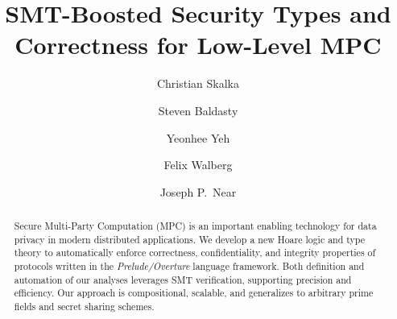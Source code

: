 \title{SMT-Boosted Security Types and Correctness for Low-Level MPC}

\author{Christian Skalka}

\author{Steven Baldasty}

\author{Yeonhee Yeh}

\author{Felix Walberg}

\author{Joseph P.~Near}

\begin{abstract}
  Secure Multi-Party Computation (MPC) is an important enabling
  technology for data privacy in modern distributed applications. We
  develop a new Hoare logic and type theory to automatically enforce
  correctness, confidentiality, and integrity properties of protocols
  written in the \emph{Prelude/Overture} language framework. Both
  definition and automation of our analyses leverages SMT
  verification, supporting precision and efficiency. Our approach is
  compositional, scalable, and generalizes to arbitrary prime fields
  and secret sharing schemes.
\end{abstract} 

